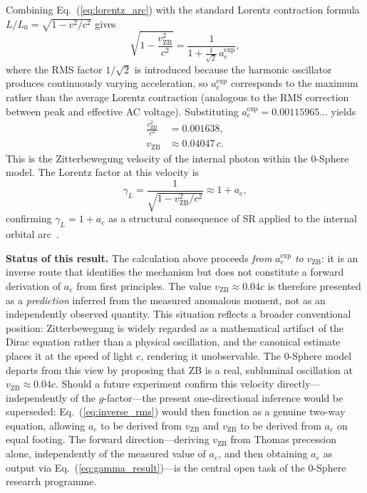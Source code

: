 \documentclass[%
 reprint, amsmath,amssymb, aps, prb, ]{revtex4-2}
\numberwithin{equation}{section}
\newcommand{\vZB}{v_{\text{ZB}}}
\newcommand{\aexp}{a_{e}^{\text{exp}}}
\newcommand{\gammaL}{\gamma_{L}}
\begin{document}
Combining Eq.~(\ref{eq:lorentz_arc}) with the standard Lorentz contraction formula $L/L_0 = \sqrt{1 - v^2/c^2}$ gives~\cite{Hanamura_2023_10,Hanamura_2025_14}
\begin{equation}
\sqrt{1 - \frac{\vZB^2}{c^2}} = \frac{1}{1 + \tfrac{1}{\sqrt{2}}\,\aexp},
\label{eq:inverse_rms}
\end{equation}
where the RMS factor $1/\sqrt{2}$ is introduced because the harmonic oscillator produces continuously varying acceleration, so $\aexp$ corresponds to the maximum rather than the average Lorentz contraction (analogous to the RMS correction between peak and effective AC voltage). Substituting $\aexp = 0.00115965\ldots$ yields
\begin{align}
\frac{\vZB^2}{c^2} &= 0.001638, \label{eq:beta_sq} \\
\vZB &\approx 0.04047\,c. \label{eq:v_ZB_result}
\end{align}
This is the Zitterbewegung velocity of the internal photon within the 0-Sphere model. The Lorentz factor at this velocity is
\begin{equation}
\gammaL = \frac{1}{\sqrt{1 - \vZB^2/c^2}} \approx 1 + a_e,
\label{eq:gamma_result}
\end{equation}
confirming $\gammaL = 1 + a_e$ as a structural consequence of SR applied to the internal orbital arc~\cite{Hanamura_2025_14,Hanamura_2025_15}.

\textbf{Status of this result.} The calculation above proceeds \emph{from} $\aexp$ \emph{to} $\vZB$: it is an inverse route that identifies the mechanism but does not constitute a forward derivation of $a_e$ from first principles. The value $\vZB \approx 0.04c$ is therefore presented as a \emph{prediction} inferred from the measured anomalous moment, not as an independently observed quantity. This situation reflects a broader conventional position: Zitterbewegung is widely regarded as a mathematical artifact of the Dirac equation rather than a physical oscillation, and the canonical estimate places it at the speed of light $c$, rendering it unobservable. The 0-Sphere model departs from this view by proposing that ZB is a real, subluminal oscillation at $\vZB \approx 0.04c$. Should a future experiment confirm this velocity directly---independently of the $g$-factor---the present one-directional inference would be superseded: Eq.~(\ref{eq:inverse_rms}) would then function as a genuine two-way equation, allowing $a_e$ to be derived from $\vZB$ and $\vZB$ to be derived from $a_e$ on equal footing. The forward direction---deriving $\vZB$ from Thomas precession alone, independently of the measured value of $a_e$, and then obtaining $a_e$ as output via Eq.~(\ref{eq:gamma_result})---is the central open task of the 0-Sphere research programme.
\end{document}
